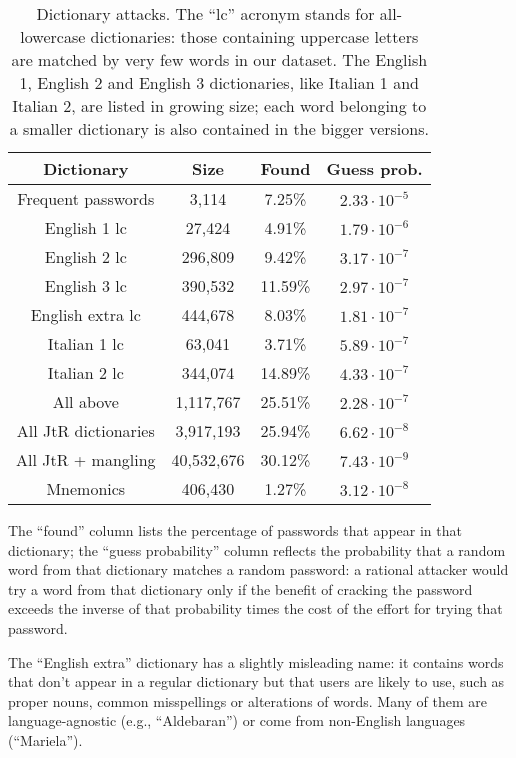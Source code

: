 \documentclass[a4paper,twocolumn]{article}
\providecommand{\tabularnewline}{\\}
\begin{document}
\begin{table}
\begin{centering}
\begin{tabular}{|c|c|c|c|}
\hline 
Dictionary & Size & Found & Guess prob.\tabularnewline
\hline
\hline 
Frequent passwords & 3,114 & 7.25\% & $2.33\cdot10^{-5}$\tabularnewline
\hline 
English 1 lc & 27,424 & 4.91\% & $1.79\cdot10^{-6}$\tabularnewline
\hline 
English 2 lc & 296,809 & 9.42\% & $3.17\cdot10^{-7}$\tabularnewline
\hline 
English 3 lc & 390,532 & 11.59\% & $2.97\cdot10^{-7}$\tabularnewline
\hline 
English extra lc & 444,678 & 8.03\% & $1.81\cdot10^{-7}$\tabularnewline
\hline 
Italian 1 lc & 63,041 & 3.71\% & $5.89\cdot10^{-7}$\tabularnewline
\hline 
Italian 2 lc & 344,074 & 14.89\% & $4.33\cdot10^{-7}$\tabularnewline
\hline 
All above & 1,117,767 & 25.51\% & $2.28\cdot10^{-7}$\tabularnewline
\hline 
All JtR dictionaries & 3,917,193 & 25.94\% & $6.62\cdot10^{-8}$\tabularnewline
\hline 
All JtR + mangling & 40,532,676 & 30.12\% & $7.43\cdot10^{-9}$\tabularnewline
\hline 
Mnemonics \cite{Kuo2006Human} & 406,430 & 1.27\% & $3.12\cdot10^{-8}$\tabularnewline
\hline
\end{tabular}
\par\end{centering}

\caption{\label{tab:Dictionary-attacks}Dictionary attacks. The {}``lc''
acronym stands for all-lowercase dictionaries: those containing uppercase
letters are matched by very few words in our dataset. The English
1, English 2 and English 3 dictionaries, like Italian 1 and Italian
2, are listed in growing size; each word belonging to a smaller dictionary
is also contained in the bigger versions.}

\end{table}


The {}``found'' column lists the percentage of passwords that appear
in that dictionary; the {}``guess probability'' column reflects
the probability that a random word from that dictionary matches a
random password: a rational attacker would try a word from that dictionary
only if the benefit of cracking the password exceeds the inverse of
that probability times the cost of the effort for trying that password.

The {}``English extra'' dictionary has a slightly misleading name:
it contains words that don't appear in a regular dictionary but that
users are likely to use, such as proper nouns, common misspellings
or alterations of words. Many of them are language-agnostic (e.g.,
{}``Aldebaran'') or come from non-English languages ({}``Mariela'').
\end{document}
